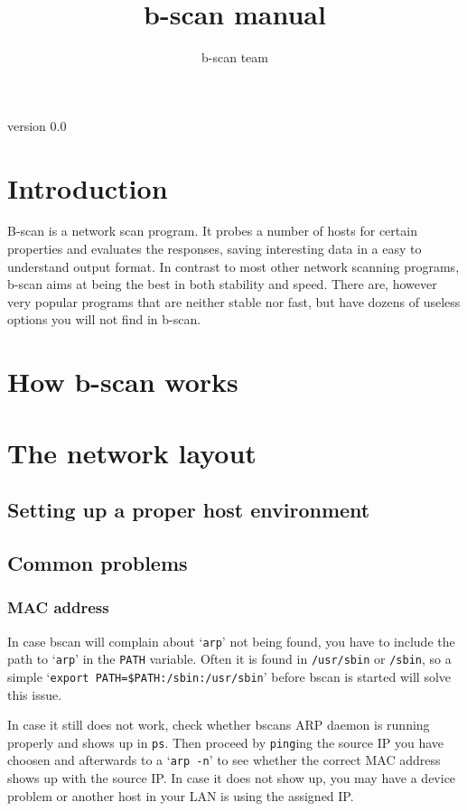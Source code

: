 \documentclass[11pt,a4paper,twoside]{article}
\begin{document}
\title{b-scan manual}
\author{b-scan team}
\maketitle
\begin{center}
version 0.0
\end{center}

\tableofcontents


\section{Introduction}
B-scan is a network scan program. It probes a number of hosts for certain
properties and evaluates the responses, saving interesting data in a easy
to understand output format. In contrast to most other network scanning
programs, b-scan aims at being the best in both stability and speed. There are,
however very popular programs that are neither stable nor fast, but have
dozens of useless options you will not find in b-scan.

\section{How b-scan works}

\section{The network layout}

\subsection{Setting up a proper host environment}
\subsection{Common problems}
\subsubsection{MAC address}
In case bscan will complain about `{\tt arp}' not being found, you have to
include the path to `{\tt arp}' in the {\tt PATH} variable. Often it is
found in {\tt /usr/sbin} or {\tt /sbin}, so a simple
`{\tt export PATH=\$PATH:/sbin:/usr/sbin}' before bscan is started will
solve this issue.

In case it still does not work, check whether bscans ARP daemon is running
properly and shows up in {\tt ps}. Then proceed by {\tt ping}ing the source
IP you have choosen and afterwards to a `{\tt arp -n}' to see whether the
correct MAC address shows up with the source IP. In case it does not show
up, you may have a device problem or another host in your LAN is using the
assigned IP.
\end{document}
